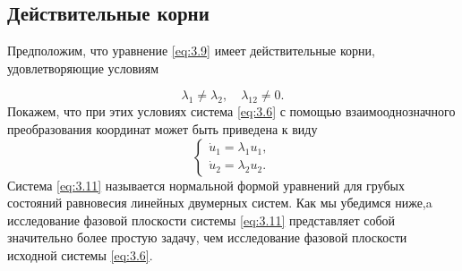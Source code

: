 \subsection{Действительные корни}%
\label{ssub:3.2.1}

Предположим, что уравнение \eqref{eq:3.9} имеет действительные корни, удовлетворяющие условиям

\begin{equation}
        \label{eq:3.10}
        \lambda_1\neq \lambda_2, \quad \lambda_{12}\neq 0.
\end{equation}
Покажем, что при этих условиях система \eqref{eq:3.6} с помощью взаимооднозначного преобразования координат может быть приведена к виду
\begin{equation}
        \label{eq:3.11}
        \begin{cases}
                \dot u_1 = \lambda_1 u_1,\\
                \dot u_2 = \lambda_2 u_2.
        \end{cases}
\end{equation}
Система \eqref{eq:3.11} называется нормальной формой уравнений для грубых состояний равновесия линейных двумерных систем. Как мы убедимся ниже,a исследование фазовой плоскости системы \eqref{eq:3.11} представляет собой значительно более простую задачу, чем исследование фазовой плоскости исходной   системы \eqref{eq:3.6}.

